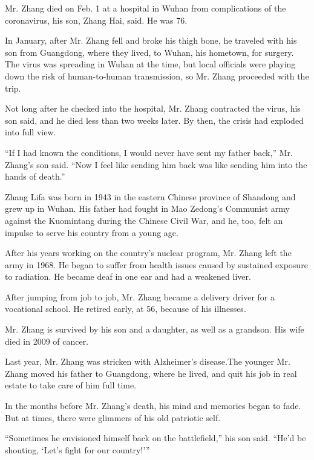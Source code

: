 Mr. Zhang died on Feb. 1 at a hospital in Wuhan from complications of
the coronavirus, his son, Zhang Hai, said. He was 76.

In January, after Mr. Zhang fell and broke his thigh bone, he traveled
with his son from Guangdong, where they lived, to Wuhan, his hometown,
for surgery. The virus was spreading in Wuhan at the time, but local
officials were playing down the risk of human-to-human transmission, so
Mr. Zhang proceeded with the trip.

Not long after he checked into the hospital, Mr. Zhang contracted the
virus, his son said, and he died less than two weeks later. By then, the
crisis had exploded into full view.

``If I had known the conditions, I would never have sent my father
back,'' Mr. Zhang's son said. ``Now I feel like sending him back was
like sending him into the hands of death.''

Zhang Lifa was born in 1943 in the eastern Chinese province of Shandong
and grew up in Wuhan. His father had fought in Mao Zedong's Communist
army against the Kuomintang during the Chinese Civil War, and he, too,
felt an impulse to serve his country from a young age.

After his years working on the country's nuclear program, Mr. Zhang left
the army in 1968. He began to suffer from health issues caused by
sustained exposure to radiation. He became deaf in one ear and had a
weakened liver.

After jumping from job to job, Mr. Zhang became a delivery driver for a
vocational school. He retired early, at 56, because of his illnesses.

Mr. Zhang is survived by his son and a daughter, as well as a grandson.
His wife died in 2009 of cancer.

Last year, Mr. Zhang was stricken with Alzheimer's disease.The younger
Mr. Zhang moved his father to Guangdong, where he lived, and quit his
job in real estate to take care of him full time.

In the months before Mr. Zhang's death, his mind and memories began to
fade. But at times, there were glimmers of his old patriotic self.

``Sometimes he envisioned himself back on the battlefield,'' his son
said. ``He'd be shouting, `Let's fight for our country!'''

\href{https://www.nytimes.com/interactive/2020/obituaries/people-died-coronavirus-obituaries.html?action=click\&pgtype=Article\&state=default\&region=BELOW_MAIN_CONTENT\&context=covid_obits_promo}{}


